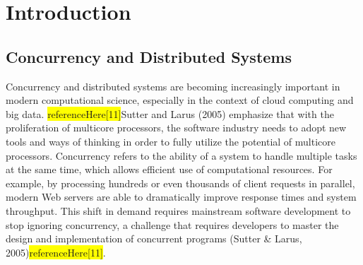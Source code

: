 \documentclass{l4proj}
\begin{document}
%
%
%
%
%
%
%
%
\chapter{Introduction}



\section{Concurrency and Distributed Systems}
Concurrency and distributed systems are becoming increasingly important in modern computational science, especially in the context of cloud computing and big data. \colorbox{yellow}{referenceHere[11]}Sutter and Larus (2005) emphasize that with the proliferation of multicore processors, the software industry needs to adopt new tools and ways of thinking in order to fully utilize the potential of multicore processors. Concurrency refers to the ability of a system to handle multiple tasks at the same time, which allows efficient use of computational resources. For example, by processing hundreds or even thousands of client requests in parallel, modern Web servers are able to dramatically improve response times and system throughput. This shift in demand requires mainstream software development to stop ignoring concurrency, a challenge that requires developers to master the design and implementation of concurrent programs (Sutter & Larus, 2005)\colorbox{yellow}{referenceHere[11]}.
    
\end{document}
